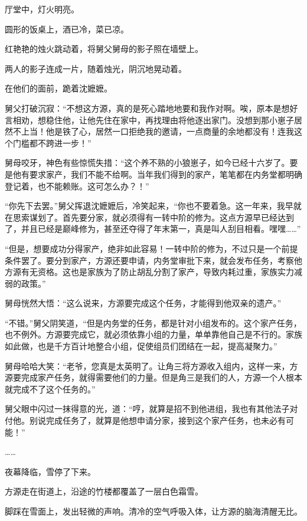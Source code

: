
\begin{this_body}

厅堂中，灯火明亮。

圆形的饭桌上，酒已冷，菜已凉。

红艳艳的烛火跳动着，将舅父舅母的影子照在墙壁上。

两人的影子连成一片，随着烛光，阴沉地晃动着。

在他们的面前，跪着沈嬷嬷。

舅父打破沉寂：“不想这方源，真的是死心踏地地要和我作对啊。唉，原本是想好言相劝，想稳住他，让他先住在家中，再找理由将他逐出家门。没想到那小崽子居然不上当！他是铁了心，居然一口拒绝我的邀请，一点商量的余地都没有！连我这个门槛都不跨进一步！”

舅母咬牙，神色有些惊慌失措：“这个养不熟的小狼崽子，如今已经十六岁了。要是他有要求家产，我们不能不给啊。当年我们得到的家产，笔笔都在内务堂都明确登记着，也不能赖账。这可怎么办？！”

“你先下去罢。”舅父挥退沈嬷嬷后，冷笑起来，“你也不要着急。这一年来，我早就在思索谋划了。首先要分家，就必须得有一转中阶的修为。这点方源早已经达到了，并且已经是巅峰修为，甚至还夺得了年末第一，真是叫人刮目相看。嘿嘿……”

“但是，想要成功分得家产，绝非如此容易！一转中阶的修为，不过只是一个前提条件罢了。要分到家产，方源还要申请，内务堂审批下来，就会发布任务，考察他方源有无资格。这也是家族为了防止胡乱分割了家产，导致内耗过重，家族实力减弱的政策。”

舅母恍然大悟：“这么说来，方源要完成这个任务，才能得到他双亲的遗产。”

“不错。”舅父阴笑道，“但是内务堂的任务，都是针对小组发布的。这个家产任务，也不例外。方源要完成它，就必须依靠小组的力量，单单靠他自己是不行的。家族如此做，也是千方百计地整合小组，促使组员们团结在一起，提高凝聚力。”

舅母哈哈大笑：“老爷，您真是太英明了。让角三将方源收入组内，这样一来，方源要完成家产任务，就得需要他们的力量。但是角三是我们的人，方源一个人根本就完成不了这个任务的。”

舅父眼中闪过一抹得意的光，道：“哼，就算是招不到他进组，我也有其他法子对付他。别说完成任务了，就算是他想申请分家，接到这个家产任务，也未必有可能！”

……

夜幕降临，雪停了下来。

方源走在街道上，沿途的竹楼都覆盖了一层白色霜雪。

脚踩在雪面上，发出轻微的声响。清冷的空气呼吸入体，让方源的脑海清醒无比。


\end{this_body}
